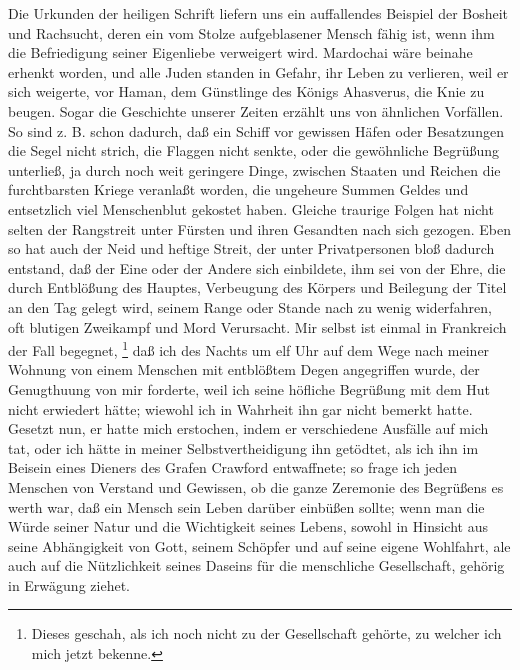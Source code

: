 Die Urkunden der heiligen Schrift liefern uns ein auffallendes Beispiel der
Bosheit und Rachsucht, deren ein vom Stolze aufgeblasener Mensch fähig ist, wenn
ihm die Befriedigung seiner Eigenliebe verweigert wird.
Mardochai wäre beinahe
erhenkt worden, und alle Juden standen in Gefahr, ihr Leben zu verlieren, weil
er sich weigerte, vor Haman, dem Günstlinge des Königs
Ahasverus, die Knie zu
beugen. Sogar die Geschichte unserer Zeiten erzählt uns von
ähnlichen Vorfällen.
So sind z. B. schon dadurch, daß ein Schiff vor gewissen Häfen oder Besatzungen
die Segel nicht strich, die Flaggen nicht senkte, oder die gewöhnliche
Begrüßung
unterließ, ja durch noch weit geringere Dinge, zwischen Staaten und Reichen die
furchtbarsten Kriege veranlaßt worden, die ungeheure Summen Geldes
und
entsetzlich viel Menschenblut gekostet haben. Gleiche traurige Folgen hat nicht
selten der Rangstreit unter Fürsten und ihren Gesandten nach sich gezogen. Eben
so hat auch der Neid und heftige Streit, der unter Privatpersonen bloß dadurch
entstand, daß der Eine oder der Andere sich einbildete, ihm sei von der Ehre,
die durch Entblößung des Hauptes,
Verbeugung des Körpers und Beilegung der Titel
an den Tag gelegt wird, seinem Range oder Stande nach zu wenig widerfahren, oft
blutigen Zweikampf und Mord Verursacht. Mir selbst ist einmal
in Frankreich
der Fall begegnet,
\footnote{Dieses geschah, als ich noch nicht zu der
Gesellschaft gehörte, zu welcher ich mich jetzt bekenne.}
 daß ich des Nachts um
elf Uhr auf dem Wege nach meiner Wohnung von einem Menschen mit entblößtem Degen
angegriffen wurde, der Genugthuung von mir forderte, weil ich
seine höfliche
Begrüßung mit dem Hut nicht erwiedert hätte; wiewohl ich in
Wahrheit ihn gar
nicht bemerkt hatte. Gesetzt nun, er hatte mich erstochen, indem er verschiedene
Ausfälle auf mich tat, oder ich hätte in meiner Selbstvertheidigung ihn
getödtet, als ich ihn im Beisein eines Dieners des Grafen
Crawford
entwaffnete; so frage ich jeden Menschen von Verstand und Gewissen, ob die ganze
Zeremonie des Begrüßens es werth war, daß ein Mensch sein Leben darüber einbüßen
sollte; wenn man die Würde seiner Natur und die Wichtigkeit seines Lebens,
sowohl in Hinsicht aus seine Abhängigkeit von Gott, seinem Schöpfer und auf
seine eigene Wohlfahrt, ale auch auf die Nützlichkeit seines Daseins für die
menschliche Gesellschaft, gehörig in Erwägung ziehet.


